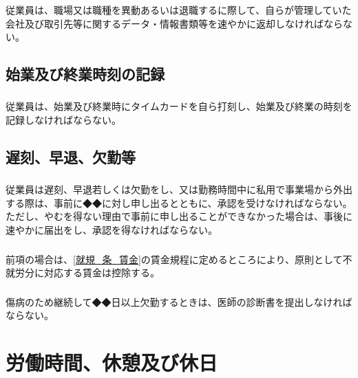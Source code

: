 \documentclass{jsarticle}
\begin{document}
\subsubsection{}
\label{就規_項_退職時個人情報取扱}
従業員は、職場又は職種を異動あるいは退職するに際して、自らが管理していた会社及び取引先等に関するデータ・情報書類等を速やかに返却しなければならない。

\subsection{始業及び終業時刻の記録}
\label{就規_条_始業及び終業時刻の記録}
\subsubsection{}
\label{就規_項_始業及び終業時刻の記録}
従業員は、始業及び終業時にタイムカードを自ら打刻し、始業及び終業の時刻を記録しなければならない。

\subsection{遅刻、早退、欠勤等}
\label{就規_条_遅刻、早退、欠勤等}
\subsubsection{}
\label{就規_項_遅刻、早退、欠勤等}
従業員は遅刻、早退若しくは欠勤をし、又は勤務時間中に私用で事業場から外出する際は、事前に◆◆に対し申し出るとともに、承認を受けなければならない。ただし、やむを得ない理由で事前に申し出ることができなかった場合は、事後に速やかに届出をし、承認を得なければならない。
\subsubsection{}
\label{就規_項_遅刻、早退、欠勤等による賃金控除}
前項の場合は、\ref{就規_条_賃金}の賃金規程に定めるところにより、原則として不就労分に対応する賃金は控除する。
\subsubsection{}
\label{就規_項_診断書の提出}
傷病のため継続して◆◆日以上欠勤するときは、医師の診断書を提出しなければならない。

\section{労働時間、休憩及び休日}
\label{就規_章_労働時間、休憩及び休日}
\end{document}
